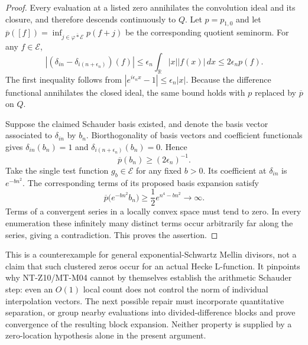 \begin{proof}
Every evaluation at a listed zero annihilates the convolution ideal
and its closure, and therefore descends continuously to $Q$.
Let $p=p_{1,0}$ and let
$\overline p([f])=\inf_{j\in\overline{\varphi*\mathcal E}}p(f+j)$
be the corresponding quotient seminorm. For any $f\in\mathcal E$,
\[
 |(\delta_{in}-\delta_{i(n+\epsilon_n)})(f)|
  \le\epsilon_n\int_{\mathbb R}|x||f(x)|\,dx
  \le2\epsilon_n p(f).
\]
The first inequality follows from
$|e^{i\epsilon_n x}-1|\le\epsilon_n|x|$.
Because the difference functional annihilates the closed ideal,
the same bound holds with $p$ replaced by $\overline p$ on $Q$.

Suppose the claimed Schauder basis existed, and denote the basis
vector associated to $\delta_{in}$ by $b_n$. Biorthogonality of
basis vectors and coefficient functionals gives
$\delta_{in}(b_n)=1$ and
$\delta_{i(n+\epsilon_n)}(b_n)=0$. Hence
\[
                 \overline p(b_n)\ge(2\epsilon_n)^{-1}.
\]
Take the single test function $g_b\in\mathcal E$ for any fixed
$b>0$. Its coefficient at $\delta_{in}$ is $e^{-bn^2}$.
The corresponding terms of its proposed basis expansion satisfy
\[
 \overline p\bigl(e^{-bn^2}b_n\bigr)
        \ge\frac12 e^{n^4-bn^2}\longrightarrow\infty.
\]
Terms of a convergent series in a locally convex space must tend
to zero. In every enumeration these infinitely many distinct terms
occur arbitrarily far along the series, giving a contradiction.
This proves the assertion.
\end{proof}

This is a counterexample for general exponential-Schwartz Mellin
divisors, not a claim that such clustered zeros occur for an actual
Hecke L-function. It pinpoints why NT-Z10/MT-M04 cannot by themselves
establish the arithmetic Schauder step: even an $O(1)$ local count
does not control the norm of individual interpolation vectors.
The next possible repair must incorporate quantitative separation,
or group nearby evaluations into divided-difference blocks and prove
convergence of the resulting block expansion. Neither property is
supplied by a zero-location hypothesis alone in the present argument.
